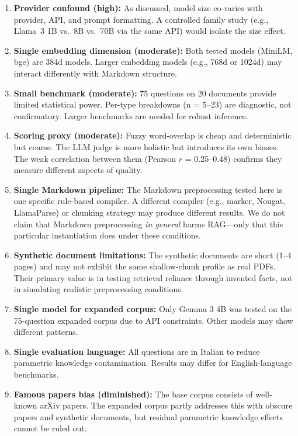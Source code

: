 \documentclass{article}
\begin{document}
\begin{enumerate}
    \item \textbf{Provider confound (high):} As discussed, model size co-varies with provider, API, and prompt formatting. A controlled family study (e.g., Llama~3 1B vs.\ 8B vs.\ 70B via the same API) would isolate the size effect.

    \item \textbf{Single embedding dimension (moderate):} Both tested models (MiniLM, bge) are 384d models. Larger embedding models (e.g., 768d or 1024d) may interact differently with Markdown structure.

    \item \textbf{Small benchmark (moderate):} 75 questions on 20 documents provide limited statistical power. Per-type breakdowns (n = 5--23) are diagnostic, not confirmatory. Larger benchmarks are needed for robust inference.

    \item \textbf{Scoring proxy (moderate):} Fuzzy word-overlap is cheap and deterministic but coarse. The LLM judge is more holistic but introduces its own biases. The weak correlation between them (Pearson $r$ = 0.25--0.48) confirms they measure different aspects of quality.

    \item \textbf{Single Markdown pipeline:} The Markdown preprocessing tested here is one specific rule-based compiler. A different compiler (e.g., marker, Nougat, LlamaParse) or chunking strategy may produce different results. We do not claim that Markdown preprocessing \emph{in general} harms RAG---only that this particular instantiation does under these conditions.

    \item \textbf{Synthetic document limitations:} The synthetic documents are short (1--4 pages) and may not exhibit the same shallow-chunk profile as real PDFs. Their primary value is in testing retrieval reliance through invented facts, not in simulating realistic preprocessing conditions.

    \item \textbf{Single model for expanded corpus:} Only Gemma 3 4B was tested on the 75-question expanded corpus due to API constraints. Other models may show different patterns.

    \item \textbf{Single evaluation language:} All questions are in Italian to reduce parametric knowledge contamination. Results may differ for English-language benchmarks.

    \item \textbf{Famous papers bias (diminished):} The base corpus consists of well-known arXiv papers. The expanded corpus partly addresses this with obscure papers and synthetic documents, but residual parametric knowledge effects cannot be ruled out.
\end{enumerate}
\end{document}
